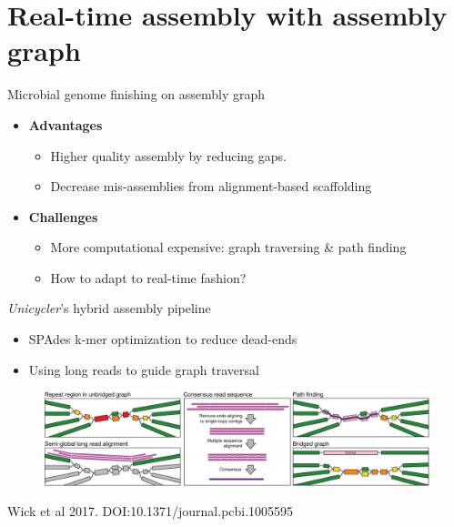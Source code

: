 \documentclass{beamer}
\begin{document}
\section{Real-time assembly with assembly graph}
\begin{frame}{Microbial genome finishing on assembly graph}
\begin{itemize}
\item \textbf{Advantages}
  \begin{itemize}
  \item Higher quality assembly by reducing gaps.
  \item Decrease mis-assemblies from alignment-based scaffolding
  \end{itemize} 
\item \textbf{Challenges}
  \begin{itemize}
  \item More computational expensive: graph traversing \& path finding
  \item	How to adapt to real-time fashion?
  \end{itemize} 
\end{itemize}
\end{frame}
\begin{frame}{\emph{Unicycler}'s hybrid assembly pipeline}
\begin{itemize}
\item SPAdes k-mer optimization to reduce dead-ends
\item Using long reads to guide graph traversal
\end{itemize}
\begin{figure}[!hpb]
\centering
\includegraphics[width=.9\textwidth]{long_read_bridging.png}
\end{figure}
\vspace*{-0.3cm}
Wick et al 2017.  DOI:10.1371/journal.pcbi.1005595
\end{frame}
\end{document}
